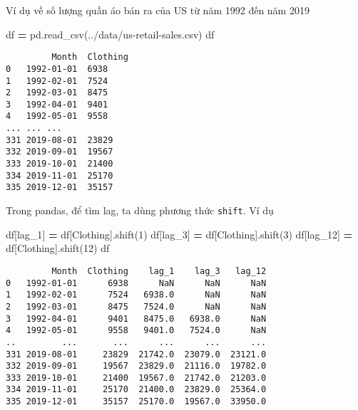 \documentclass[
]{book}
\newenvironment{Shaded}{\begin{snugshade}}{\end{snugshade}}
\newcommand{\DecValTok}[1]{\textcolor[rgb]{0.00,0.00,0.81}{#1}}
\newcommand{\NormalTok}[1]{#1}
\newcommand{\OperatorTok}[1]{\textcolor[rgb]{0.81,0.36,0.00}{\textbf{#1}}}
\newcommand{\StringTok}[1]{\textcolor[rgb]{0.31,0.60,0.02}{#1}}
\begin{document}
Ví dụ về số lượng quần áo bán ra của US từ năm 1992 đến năm 2019

\begin{Shaded}
\begin{Highlighting}[]
\NormalTok{df }\OperatorTok{=}\NormalTok{ pd.read\_csv(}\StringTok{\textquotesingle{}../data/us{-}retail{-}sales.csv\textquotesingle{}}\NormalTok{)}
\NormalTok{df}
\end{Highlighting}
\end{Shaded}

\begin{verbatim}
         Month  Clothing
0   1992-01-01  6938
1   1992-02-01  7524
2   1992-03-01  8475
3   1992-04-01  9401
4   1992-05-01  9558
... ... ...
331 2019-08-01  23829
332 2019-09-01  19567
333 2019-10-01  21400
334 2019-11-01  25170
335 2019-12-01  35157
\end{verbatim}

Trong pandas, để tìm lag, ta dùng phương thức \texttt{shift}. Ví dụ

\begin{Shaded}
\begin{Highlighting}[]
\NormalTok{df[}\StringTok{\textquotesingle{}lag\_1\textquotesingle{}}\NormalTok{] }\OperatorTok{=}\NormalTok{ df[}\StringTok{\textquotesingle{}Clothing\textquotesingle{}}\NormalTok{].shift(}\DecValTok{1}\NormalTok{)}
\NormalTok{df[}\StringTok{\textquotesingle{}lag\_3\textquotesingle{}}\NormalTok{] }\OperatorTok{=}\NormalTok{ df[}\StringTok{\textquotesingle{}Clothing\textquotesingle{}}\NormalTok{].shift(}\DecValTok{3}\NormalTok{)}
\NormalTok{df[}\StringTok{\textquotesingle{}lag\_12\textquotesingle{}}\NormalTok{] }\OperatorTok{=}\NormalTok{ df[}\StringTok{\textquotesingle{}Clothing\textquotesingle{}}\NormalTok{].shift(}\DecValTok{12}\NormalTok{)}
\NormalTok{df}
\end{Highlighting}
\end{Shaded}

\begin{verbatim}
         Month  Clothing    lag_1    lag_3   lag_12
0   1992-01-01      6938      NaN      NaN      NaN
1   1992-02-01      7524   6938.0      NaN      NaN
2   1992-03-01      8475   7524.0      NaN      NaN
3   1992-04-01      9401   8475.0   6938.0      NaN
4   1992-05-01      9558   9401.0   7524.0      NaN
..         ...       ...      ...      ...      ...
331 2019-08-01     23829  21742.0  23079.0  23121.0
332 2019-09-01     19567  23829.0  21116.0  19782.0
333 2019-10-01     21400  19567.0  21742.0  21203.0
334 2019-11-01     25170  21400.0  23829.0  25364.0
335 2019-12-01     35157  25170.0  19567.0  33950.0
\end{verbatim}
\end{document}
